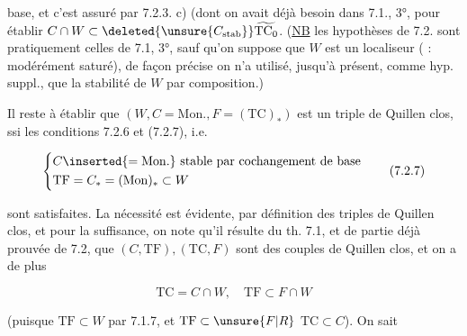 

base, et c'est assuré par 7.2.3. c) (dont on avait déjà besoin dans 7.1., 3°, pour établir $C\cap W\subset\deleted{\unsure{C_{\mathrm{stab}}}}\widetilde{\mathrm{TC}_0}$. (\uline{NB} les hypothèses de 7.2. sont pratiquement celles de 7.1, 3°, sauf qu'on suppose que $W$ est un localiseur ( : modérément saturé), de façon précise on n'a utilisé, jusqu'à présent, comme hyp. suppl., que la stabilité de $W$ par composition.)


Il reste à établir que $(W,C=\mathrm{Mon.},F=(\mathrm{TC})_*)$ est un triple de Quillen clos, ssi les conditions 7.2.6 et (7.2.7), i.e.

\[
\left\{\begin{aligned}
&C\inserted{=\mathrm{Mon}.}\ \text{stable par cochangement de base}\\
&\mathrm{TF}=C_*=(\mathrm{Mon})_*\subset W
\end{aligned}\right.\tag*{(7.2.7)}
\]

sont satisfaites. La nécessité est évidente, par définition des triples de Quillen clos, et pour la suffisance, on note qu'il résulte du th. 7.1,  et de  partie déjà prouvée de 7.2, que $(C,\mathrm{TF}),(\mathrm{TC},F)$ sont des couples de Quillen clos, et on a de plus

\[
\mathrm{TC}=C\cap W,\quad \mathrm{TF}\subset F\cap W
\]

(puisque $\mathrm{TF}\subset W$ par 7.1.7, et $\mathrm{TF}\subset\unsure{F|R}$  $\mathrm{TC}\subset C$).  On sait
